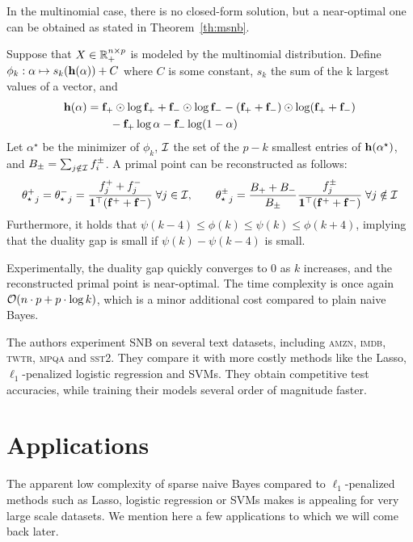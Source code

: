 In the multinomial case, there is no closed-form solution, but a near-optimal one can be obtained as
stated in Theorem~\ref{th:msnb}.
\begin{theorem}\label{th:msnb}
Suppose that $X \in \mathbb{R}_+^{n \times p}$ is modeled by the multinomial distribution.
Define $\phi_k : \alpha \mapsto s_k(\mathbf{h}(\alpha)) + C$ where $C$ is some constant,
$s_k$ the sum of the k largest values of a vector, and
\begin{equation*}
        \begin{split}
                \mathbf{h}(\alpha) &= \mathbf{f}_+ \odot \log \mathbf{f}_+ + \mathbf{f}_- \odot \log \mathbf{f}_-
                                - (\mathbf{f}_+ + \mathbf{f}_-) \odot \log (\mathbf{f}_+ + \mathbf{f}_-)\\
                        &\qquad - \mathbf{f}_+ \log \alpha - \mathbf{f}_- \log (1 - \alpha)
        \end{split}
\end{equation*}
Let $\alpha^\star$ be the minimizer of $\phi_k$, $\mathcal{I}$ the set of the $p - k$ smallest entries of
$\mathbf{h}(\alpha^\star)$, and $B_\pm = \sum_{j \notin \mathcal{I}} f_i^\pm$.
A primal point can be reconstructed as follows:
\[
        {\theta^+_\star}_j = {\theta^-_\star}_j = \frac{f_j^+ + f_j^-}{\mathbf{1}^\top(\mathbf{f}^+ + \mathbf{f}^-)}
        \;\forall j \in \mathcal{I}
        ,\qquad
        {\theta^\pm_\star}_j = \frac{B_+ + B_-}{B_\pm}\frac{f^\pm_j}{\mathbf{1}^\top(\mathbf{f}^+ + \mathbf{f}^-)}
        \;\forall j \notin \mathcal{I}
\]
Furthermore, it holds that $\psi(k - 4) \leq \phi(k) \leq \psi(k) \leq \phi(k + 4)$,
implying that the duality gap is small if $\psi(k) - \psi(k - 4)$ is small.
\end{theorem}
Experimentally, the duality gap quickly converges to $0$ as $k$ increases,
and the reconstructed primal point is near-optimal.
The time complexity is once again $\mathcal{O}(n \cdot p + p \cdot \log k)$,
which is a minor additional cost compared to plain naive Bayes.

The authors experiment SNB on several text datasets,
including \textsc{amzn}, \textsc{imdb}, \textsc{twtr}, \textsc{mpqa} and \textsc{sst2}.
They compare it with more costly methods like the Lasso, $\ell_1$-penalized logistic regression and SVMs.
They obtain competitive test accuracies, while training their models several order of magnitude faster.

\section{Applications}\label{sec:nb_app}

The apparent low complexity of sparse naive Bayes compared to $\ell_1$-penalized methods such as
Lasso, logistic regression or SVMs makes is appealing for very large scale datasets.
We mention here a few applications to which we will come back later.

